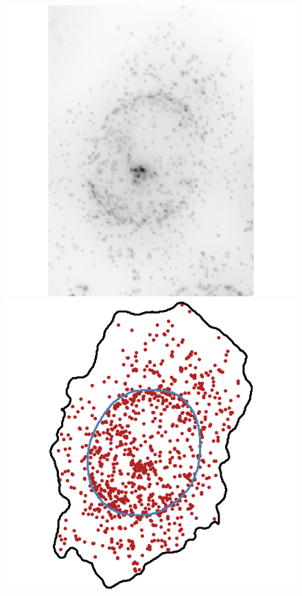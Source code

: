 \begin{figure}[]
		\includegraphics[width=0.95\linewidth]{figures/introduction/real_image_nuclear_edge}
		\vfill
		\includegraphics[width=0.95\linewidth]{figures/introduction/real_coord_nuclear_edge}
	\endminipage\hfill

\end{figure}
